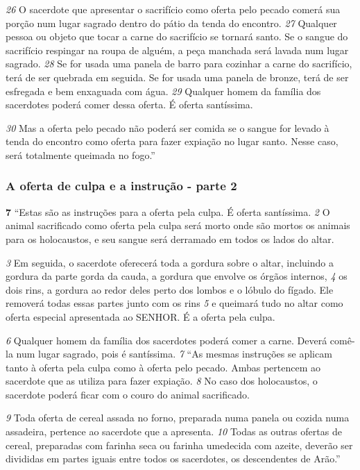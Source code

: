 \smallskip
\textit{\tiny 26}
O sacerdote que apresentar o sacrifício como
oferta pelo pecado comerá sua porção num lugar sagrado dentro do pátio da
tenda do encontro. 
\textit{\tiny 27}
Qualquer pessoa ou objeto que tocar a carne do sacrifício se
tornará santo. Se o sangue do sacrifício respingar na roupa de alguém, a peça
manchada será lavada num lugar sagrado. 
\textit{\tiny 28}
Se for usada uma panela de barro
para cozinhar a carne do sacrifício, terá de ser quebrada em seguida. Se for usada
uma panela de bronze, terá de ser esfregada e bem enxaguada com água.
\textit{\tiny 29}
Qualquer homem da família dos sacerdotes poderá comer dessa oferta. É oferta
santíssima. 

\smallskip
\textit{\tiny 30}
Mas a oferta pelo pecado não poderá ser comida se o sangue for
levado à tenda do encontro como oferta para fazer expiação no lugar santo. Nesse
caso, será totalmente queimada no fogo.”
   
\bigskip
\subsubsection*{A oferta de culpa e a instrução - parte 2}  
\textbf{\large 7} “Estas são as instruções para a oferta pela culpa. É oferta santíssima. 
\textit{\tiny 2} 
O animal sacrificado como oferta pela culpa será morto onde são mortos os animais
para os holocaustos, e seu sangue será derramado em todos os lados do altar. 

\smallskip
\textit{\tiny 3} 
Em seguida, o sacerdote oferecerá toda a gordura sobre o altar, incluindo a gordura
da parte gorda da cauda, a gordura que envolve os órgãos internos, 
\textit{\tiny 4} 
os dois rins, a gordura ao redor deles perto dos lombos e o lóbulo do fígado. Ele removerá todas
essas partes junto com os rins 
\textit{\tiny 5} 
e queimará tudo no altar como oferta especial
apresentada ao SENHOR. É a oferta pela culpa. 

\smallskip
\textit{\tiny 6} 
Qualquer homem da família dos
sacerdotes poderá comer a carne. Deverá comê-la num lugar sagrado, pois é
santíssima. 
\textit{\tiny 7} 
“As mesmas instruções se aplicam tanto à oferta pela culpa como à oferta pelo
pecado. Ambas pertencem ao sacerdote que as utiliza para fazer expiação. 
\textit{\tiny 8} 
No caso dos holocaustos, o sacerdote poderá ficar com o couro do animal
sacrificado. 

\smallskip
\textit{\tiny 9} 
Toda oferta de cereal assada no forno, preparada numa panela ou
cozida numa assadeira, pertence ao sacerdote que a apresenta. 
\textit{\tiny 10}
Todas as outras
ofertas de cereal, preparadas com farinha seca ou farinha umedecida com azeite,
deverão ser divididas em partes iguais entre todos os sacerdotes, os descendentes
de Arão.”

